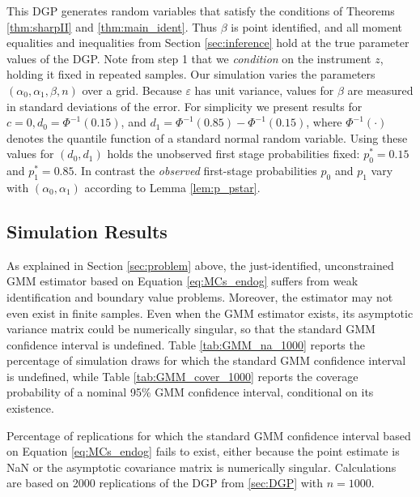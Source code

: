 This DGP generates random variables that satisfy the conditions of Theorems \ref{thm:sharpII} and \ref{thm:main_ident}.
Thus $\beta$ is point identified, and all moment equalities and inequalities from Section \ref{sec:inference} hold at the true parameter values of the DGP.
Note from step 1 that we \emph{condition} on the instrument $z$, holding it fixed in repeated samples.
Our simulation varies the parameters $(\alpha_0, \alpha_1, \beta, n)$ over a grid.
Because $\varepsilon$ has unit variance, values for $\beta$ are measured in standard deviations of the error.
For simplicity we present results for $c = 0, d_0 = \Phi^{-1}(0.15)$, and  $d_1= \Phi^{-1}(0.85) - \Phi^{-1}(0.15)$, where $\Phi^{-1}(\cdot)$ denotes the quantile function of a standard normal random variable.
Using these values for $(d_0, d_1)$ holds the unobserved first stage probabilities fixed: $p^*_0 = 0.15$ and $p^*_1 = 0.85$.
In contrast the \emph{observed} first-stage probabilities $p_0$ and $p_1$ vary with $(\alpha_0, \alpha_1)$ according to Lemma \ref{lem:p_pstar}.


\subsection{Simulation Results}

As explained in Section \ref{sec:problem} above, the just-identified, unconstrained GMM estimator based on Equation \ref{eq:MCs_endog} suffers from weak identification and boundary value problems.
Moreover, the estimator may not even exist in finite samples.
Even when the GMM estimator exists, its asymptotic variance matrix could be numerically singular, so that the standard GMM confidence interval is undefined.
Table \ref{tab:GMM_na_1000} reports the percentage of simulation draws for which the standard GMM confidence interval is undefined, while Table \ref{tab:GMM_cover_1000} reports the coverage probability of a nominal 95\% GMM confidence interval, conditional on its existence.

\begin{table}[htbp]
  \small
  \centering
  
  \caption{Percentage of replications for which the standard GMM confidence interval based on Equation \ref{eq:MCs_endog} fails to exist, either because the point estimate is NaN or the asymptotic covariance matrix is numerically singular. Calculations are based on  2000 replications of the DGP from \ref{sec:DGP} with $n = 1000$.} 
  \label{tab:GMM_na_1000}
\end{table}

